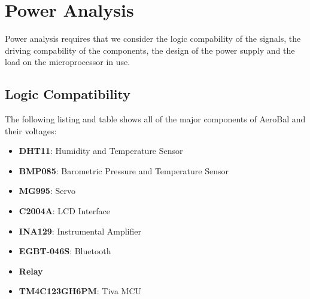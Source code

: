 \section{Power Analysis}
	Power analysis requires that we consider the logic compability of the signals, the driving compability of the components, the design of the power supply and the load on the microprocessor in use.
	
	\subsection{Logic Compatibility}
	The following listing and table shows all of the major components of AeroBal and their voltages:
	\vspace{-5mm}
	\begin{itemize}
		\item \textbf{DHT11}: Humidity and Temperature Sensor
		\item \textbf{BMP085}: Barometric Pressure and Temperature Sensor
		\item \textbf{MG995}: Servo
		\item \textbf{C2004A}: LCD Interface
		\item \textbf{INA129}: Instrumental Amplifier
		\item \textbf{EGBT-046S}: Bluetooth
		\item \textbf{Relay}
		\item \textbf{TM4C123GH6PM}: Tiva MCU
	\end{itemize}
	\vspace{-5mm}
	
